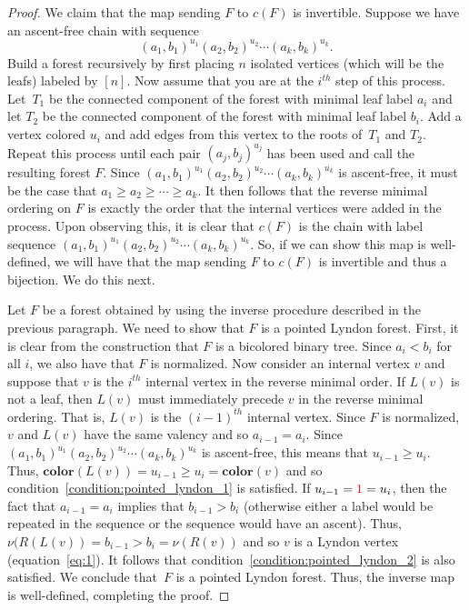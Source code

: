 \documentclass[11pt]{article}
\theoremstyle{definition}
\numberwithin{equation}{section}
\newcommand{\clr}{\mathbf{color}}
\newcommand{\tre}[1]{{\color{red}{#1}}}
\begin{document}
\begin{proof}
  We claim that the map sending $F$ to $c(F)$ is invertible.  Suppose we have an ascent-free chain with sequence 
  $$
  (a_1,b_1)^{u_1}(a_2,b_2)^{u_2}\cdots (a_{k},b_{k})^{u_{k}}.
  $$
  Build a forest recursively by first  placing $n$ isolated vertices (which will be the leafs) labeled by $[n]$. Now assume that you are at the $i^{th}$ step of this process.    Let~$T_1$ be the connected component of the forest with minimal leaf label $a_i$ and let $T_2$ be the connected component of the forest with minimal leaf label $b_i$.  Add a vertex colored $u_i$  and add edges from this vertex to the roots of~$T_1$ and $T_2$.   Repeat this process until each pair $(a_j,b_j)^{u_j}$ has been used and call the resulting forest $F$. Since $  (a_1,b_1)^{u_1}(a_2,b_2)^{u_2}\cdots (a_{k},b_{k})^{u_{k}}$ is ascent-free, it must be the case that $a_1\geq a_2\geq \cdots \geq a_k$.  It then follows that the reverse minimal ordering on $F$ is exactly the order that the internal vertices were added in the process. Upon observing this, it is clear that $c(F)$ is  the chain with label  sequence $(a_1,b_1)^{u_1}(a_2,b_2)^{u_2}\cdots (a_{k},b_{k})^{u_{k}}$. So, if we can show this map is well-defined, we will have that the map sending $F$ to $c(F)$ is invertible and thus a bijection.  We do this next.

  
  Let $F$ be a forest obtained by using the inverse procedure described in the previous paragraph. We need to show that $F$ is  a pointed Lyndon forest. First, it is clear from the construction that $F$ is a bicolored binary tree.  Since $a_i<b_i$ for all $i$, we also have that $F$ is  normalized.  Now consider an internal vertex $v$  and suppose that $v$ is the $i^{th}$ internal vertex in the reverse minimal order.  If $L(v)$ is not  a leaf,  then $L(v)$ must immediately precede $v$ in the  reverse minimal ordering.  That is, $L(v)$ is the $(i-1)^{th}$ internal vertex.  Since $F$ is normalized, $v$ and $L(v)$ have the same valency and so $a_{i-1} = a_{i}$.  Since $(a_1,b_1)^{u_1}(a_2,b_2)^{u_2}\cdots (a_{k},b_{k})^{u_{k}}$ is ascent-free, this means that $u_{i-1} \geq u_{i}$.  Thus, $\clr(L(v)) =u_{i-1} \geq u_i=\clr(v)$ and so condition~\eqref{condition:pointed_lyndon_1} is satisfied.  If $u_{i-1} =\tre{1} = u_{i}$, then the fact that $a_{i-1} = a_{i}$ implies that $b_{i-1}>b_i$ (otherwise either a label would be repeated in the sequence or the sequence would have an ascent).  Thus, 
  $\nu(R(L(v))= b_{i-1} > b_i = \nu(R(v))$ and so $v$ is a Lyndon vertex (equation~\eqref{eq:1}).  It follows that condition~\eqref{condition:pointed_lyndon_2} is also satisfied. We conclude that~$F$ is a pointed Lyndon forest.  Thus, the inverse map is well-defined, completing the proof.
  \end{proof}
\end{document}
